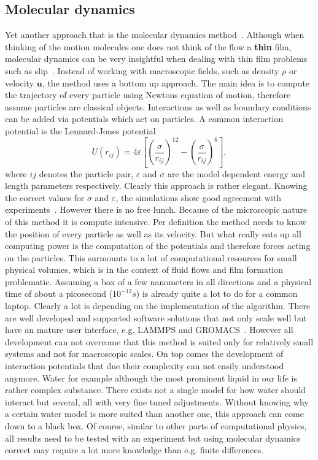 \subsection{Molecular dynamics}
Yet another approach that is the molecular dynamics method~\cite{haile1992molecular, zhangMolecularSimulationThin2019, doi:10.1063/1.1290698}.
Although when thinking of the motion molecules one does not think of the flow a \textbf{thin} film, molecular dynamics can be very insightful when dealing with thin film problems such as slip~\cite{jabbarzadeh1999wall, sega2013regularization}. 
Instead of working with macroscopic fields, such as density $\rho$ or velocity $\mathbf{u}$, the method uses a bottom up approach.
The main idea is to compute the trajectory of every particle using Newtons equation of motion, therefore assume particles are classical objects.
Interactions as well as boundary conditions can be added via potentials which act on particles.
A common interaction potential is the Lennard-Jones potential
\begin{equation}\label{eq:Len-Jon}
    U(r_{ij}) = 4\varepsilon\left[\left(\frac{\sigma}{r_{ij}}\right)^{12}-\left(\frac{\sigma}{r_{ij}}\right)^6\right],
\end{equation}
where $ij$ denotes the particle pair, $\varepsilon$ and $\sigma$ are the model dependent energy and length parameters respectively.
Clearly this approach is rather elegant.
Knowing the correct values for $\sigma$ and $\varepsilon$, the simulations show good agreement with experiments~\cite{zhangMolecularSimulationThin2019}.
However there is no free lunch. 
Because of the microscopic nature of this method it is compute intensive.
Per definition the method needs to know the position of every particle as well as its velocity.
But what really eats up all computing power is the computation of the potentials and therefore forces acting on the particles.
This surmounts to a lot of computational resources for small physical volumes, which is in the context of fluid flows and film formation problematic.
Assuming a box of a few nanometers in all directions and a physical time of about a picosecond ($10^{-12}s$) is already quite a lot to do for a common laptop.
Clearly a lot is depending on the implementation of the algorithm. 
There are well developed and supported software solutions that not only scale well but have an mature user interface, e.g. LAMMPS and GROMACS~\cite{PLIMPTON19951, BERENDSEN199543, lindahl2001gromacs}.  
However all development can not overcome that this method is suited only for relatively small systems and not for macroscopic scales.
On top comes the development of interaction potentials that due their complexity can not easily understood anymore.
Water for example although the most prominent liquid in our life is rather complex substance.
There exists not a single model for how water should interact but several, all with very fine tuned adjustments.
Without knowing why a certain water model is more suited than another one, this approach can come down to a black box.
Of course, similar to other parts of computational physics, all results need to be tested with an experiment but using molecular dynamics correct may require a lot more knowledge than e.g. finite differences.


